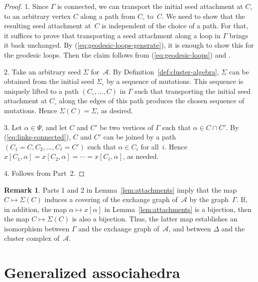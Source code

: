 \documentclass[letterpaper]{amsart}
\numberwithin{equation}{section}
\theoremstyle{definition}
\newtheorem{remark}[theorem]{Remark}
\def\AA{\mathcal{A}}
\begin{document}
\begin{proof} 
1. Since $\Gamma$ is connected, we can transport the initial seed 
attachment at $C_\circ$ to an arbitrary vertex $C$ along a path 
from $C_\circ$ to~$C$. 
We need to show that the resulting seed attachment 
at~$C$ is independent of the choice of a path. 
For that, it suffices to prove that transporting a 
seed attachment along a loop in $\Gamma$ brings it back unchanged. 
By (\ref{eq:geodesic-loops-generate}), it is enough to show this for the geodesic 
loops. Then the claim follows from (\ref{eq:geodesic-loops}) 
and \cite[Theorem~7.7]{fz-clust1}. 
 
2. Take an arbitrary seed $\Sigma$ for~$\AA$. 
By Definition~\ref{def:cluster-algebra}, $\Sigma$ can be obtained from 
the initial seed $\Sigma_\circ$ by a sequence of mutations. 
This sequence is uniquely lifted to a path $(C_\circ,\dots,C)$ in $\Gamma$ 
such that transporting the initial seed attachment at $C_\circ$ along 
the edges of this path produces the chosen sequence of mutations. 
Hence $\Sigma(C)=\Sigma$, as desired. 
 
3. Let $\alpha\in\Psi$, and let $C$ and $C'$ be two vertices of 
$\Gamma$ such that $\alpha\in C\cap C'$. 
By (\ref{eq:links-connected}), $C$ and $C'$ can be joined by a path 
$(C_1=C,C_2,\dots,C_\ell=C')$ such that $\alpha\in C_i$ for all~$i$. 
Hence $x[C_1,\alpha]=x[C_2,\alpha]=\cdots=x[C_\ell,\alpha]$, as needed. 
 
4. Follows from Part~2. 
\end{proof} 
 
\begin{remark} 
\label{rem:isom-cluster-complex} 
Parts 1 and 2 in Lemma~\ref{lem:attachments} imply that the map 
$C\mapsto \Sigma(C)$ induces a covering of the exchange graph 
of~$\AA$ by the graph~$\Gamma$. 
If, in addition, the map $\alpha\mapsto x[\alpha]$ in 
Lemma~\ref{lem:attachments} is a 
bijection, then the map $C\mapsto \Sigma(C)$ is also a bijection. 
Thus, the latter map establishes an isomorphism between $\Gamma$ and 
the exchange graph of~$\AA$, 
and between $\Delta$ and the cluster complex of~$\AA$. 
\end{remark} 
 
 
\section{Generalized associahedra} 
\label{sec:root-systems-gen-associahedra} 
 
\end{document}
